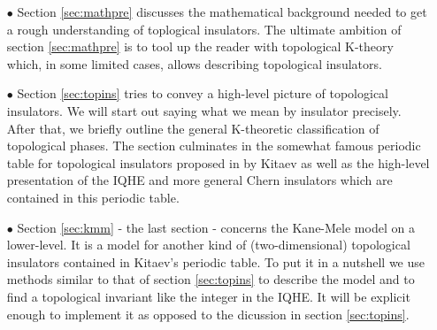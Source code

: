 \begin{enumerate}
\item[$\bullet$]
Section \ref{sec:mathpre} discusses the mathematical background needed to get a rough understanding of toplogical insulators. The ultimate ambition of section \ref{sec:mathpre} is to tool up the reader with topological K-theory which, in some limited cases, allows describing topological insulators.
\item[$\bullet$]
Section \ref{sec:topins} tries to convey a high-level picture of topological insulators. We will start out saying what we mean by insulator precisely. After that, we briefly outline the general K-theoretic classification of topological phases. The section culminates in the somewhat famous periodic table for topological insulators proposed in \cite{eda79af1} by Kitaev as well as the high-level presentation of the IQHE and more general Chern insulators which are contained in this periodic table.
\item[$\bullet$]
Section \ref{sec:kmm} - the last section - concerns the Kane-Mele model on a lower-level. It is a model for another kind of (two-dimensional) topological insulators contained in Kitaev's periodic table. To put it in a nutshell we use methods similar to that of section \ref{sec:topins} to describe the model and to find a topological invariant like the integer in the IQHE. It will be explicit enough to implement it as opposed to the dicussion in section \ref{sec:topins}.
\end{enumerate}
